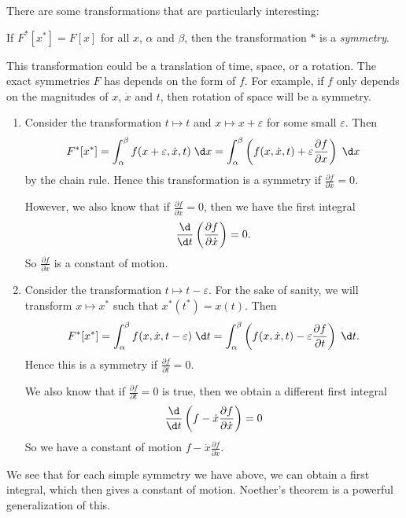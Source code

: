 \documentclass[a4paper]{article}
\begin{document}
There are some transformations that are particularly interesting:
\begin{defi}[Symmetry]
  If $F^*[x^*] = F[x]$ for all $x$, $\alpha$ and $\beta$, then the transformation $*$ is a \emph{symmetry}.
\end{defi}

This transformation could be a translation of time, space, or a rotation. The exact symmetries $F$ has depends on the form of $f$. For example, if $f$ only depends on the magnitudes of $x$, $\dot{x}$ and $t$, then rotation of space will be a symmetry.

\begin{eg}\leavevmode
  \begin{enumerate}
    \item Consider the transformation $t \mapsto t$ and $x \mapsto x + \varepsilon$ for some small $\varepsilon$. Then
      \[
        F^*[x^*] = \int_\alpha^\beta f(x + \varepsilon, \dot{x}, t)\;\d x = \int_\alpha^\beta \left(f(x, \dot{x}, t) + \varepsilon \frac{\partial f}{\partial x}\right)\;\d x
      \]
      by the chain rule. Hence this transformation is a symmetry if $\frac{\partial f}{\partial x} = 0$.

      However, we also know that if $\frac{\partial f}{\partial x} = 0$, then we have the first integral
      \[
        \frac{\d}{\d t}\left(\frac{\partial f}{\partial \dot{x}}\right) = 0.
      \]
      So $\frac{\partial f}{\partial \dot{x}}$ is a constant of motion.
    \item Consider the transformation $t \mapsto t - \varepsilon$. For the sake of sanity, we will transform $x\mapsto x^*$ such that $x^*(t^*) = x(t)$. Then
      \[
        F^*[x^*] = \int_\alpha^\beta f(x, \dot{x}, t - \varepsilon)\;\d t = \int_\alpha^\beta \left(f(x, \dot{x}, t) - \varepsilon \frac{\partial f}{\partial t}\right)\;\d t.
      \]
      Hence this is a symmetry if $\frac{\partial f}{\partial t} = 0$.

      We also know that if $\frac{\partial f}{\partial t} = 0$ is true, then we obtain a different first integral
      \[
        \frac{\d}{\d t}\left(f - \dot{x}\frac{\partial f}{\partial \dot{x}}\right) = 0
      \]
      So we have a constant of motion $f - \dot{x}\frac{\partial f}{\partial \dot{x}}$.
  \end{enumerate}
\end{eg}
We see that for each simple symmetry we have above, we can obtain a first integral, which then gives a constant of motion. Noether's theorem is a powerful generalization of this.
\end{document}
